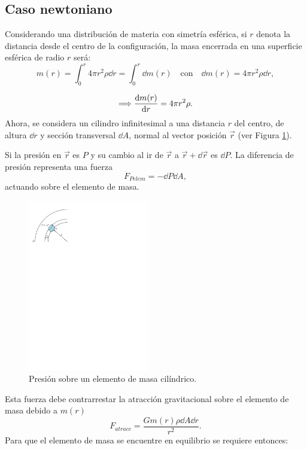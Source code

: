 \subsection{Caso newtoniano}

\noindent Considerando una distribución de materia con simetría esférica, si $r$ denota la distancia desde el centro de la configuración, la masa encerrada en una superficie esférica de radio $r$ será:  
\begin{equation}
    m ( r ) = \int _ { 0 } ^ { r } 4 \pi r ^ { 2 } \rho \dd{r} = \int_{0}^{r} \dd{m(r)} \quad\text{con}\quad \dd{m(r)}=4\pi r^2\rho \dd{r},
    \label{mN}
\end{equation}

\begin{equation}
    \Longrightarrow\dv{m(r)}{r} =4\pi r^2 \rho.
    \label{dmnewton}
\end{equation}
Ahora, se considera un cilindro infinitesimal a una distancia $r$ del centro, de altura $\dd{r}$ y sección transversal $\dd{A}$, normal al vector posición $\vec{r}$ (ver Figura \ref{stellnew}).  

Si la presión en $\vec{r}$ es $P$ y su cambio al ir de $\vec{r}$ a $\vec{r}+\dd{\vec{r}}$ es $\dd{P}$. La diferencia de presión representa una fuerza 
\begin{equation*}
    F_{Pelem}=-\dd{P}\dd{A},
\end{equation*}
actuando sobre el elemento de masa.

\begin{figure}[H]
    \centering
    \includegraphics[width=150pt]{figures/stellarnewton.pdf}
    \caption[Presión sobre un elemento de masa cilíndrico]{Presión sobre un elemento de masa cilíndrico.}
    \label{stellnew}
\end{figure}
 Esta fuerza debe contrarrestar la atracción gravitacional sobre el elemento de masa debido a $m(r)$
\begin{equation*}
    F_{atracc}=\frac{G m(r)\rho \dd{A} \dd{r}}{r^2}.
\end{equation*}
Para que el elemento de masa se encuentre en equilibrio se requiere entonces:


